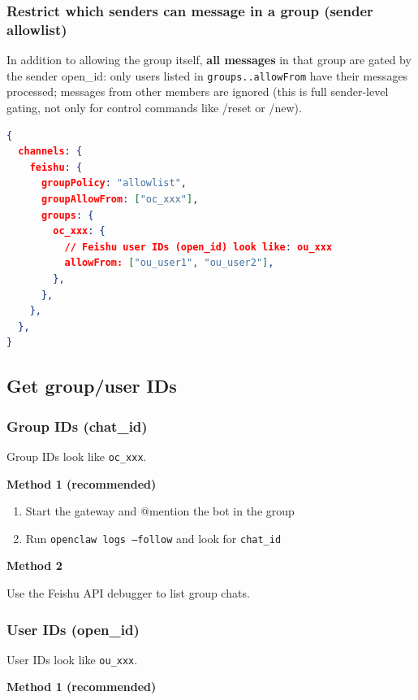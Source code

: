 \subsubsection{Restrict which senders can message in a group (sender allowlist)}


In addition to allowing the group itself, \textbf{all messages} in that group are gated by the sender open\_id: only users listed in \texttt{groups..allowFrom} have their messages processed; messages from other members are ignored (this is full sender-level gating, not only for control commands like /reset or /new).

\begin{lstlisting}[language=json]
{
  channels: {
    feishu: {
      groupPolicy: "allowlist",
      groupAllowFrom: ["oc_xxx"],
      groups: {
        oc_xxx: {
          // Feishu user IDs (open_id) look like: ou_xxx
          allowFrom: ["ou_user1", "ou_user2"],
        },
      },
    },
  },
}
\end{lstlisting}


\hrulefill


\subsection{Get group/user IDs}


\subsubsection{Group IDs (chat\_id)}


Group IDs look like \texttt{oc\_xxx}.

\textbf{Method 1 (recommended)}

\begin{enumerate}
  \item Start the gateway and @mention the bot in the group
  \item Run \texttt{openclaw logs --follow} and look for \texttt{chat\_id}
\end{enumerate}


\textbf{Method 2}

Use the Feishu API debugger to list group chats.

\subsubsection{User IDs (open\_id)}


User IDs look like \texttt{ou\_xxx}.

\textbf{Method 1 (recommended)}

